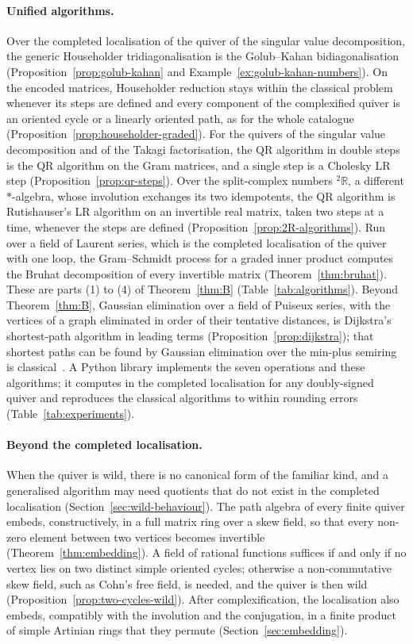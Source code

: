 \documentclass[12pt, a4paper]{report}
\theoremstyle{plain}
\theoremstyle{definition}
\theoremstyle{remark}
\theoremstyle{plain}
\newcommand{\twoR}{{}^{2}\mathbb{R}}
\begin{document}
\paragraph{Unified algorithms.} Over the completed localisation of the quiver of the singular value decomposition, the generic Householder tridiagonalisation is the Golub--Kahan bidiagonalisation (Proposition~\ref{prop:golub-kahan} and Example~\ref{ex:golub-kahan-numbers}). On the encoded matrices, Householder reduction stays within the classical problem whenever its steps are defined and every component of the complexified quiver is an oriented cycle or a linearly oriented path, as for the whole catalogue (Proposition~\ref{prop:householder-graded}). For the quivers of the singular value decomposition and of the Takagi factorisation, the QR algorithm in double steps is the QR algorithm on the Gram matrices, and a single step is a Cholesky LR step (Proposition~\ref{prop:qr-steps}). Over the split-complex numbers $\twoR$, a different $*$-algebra, whose involution exchanges its two idempotents, the QR algorithm is Rutishauser's LR algorithm on an invertible real matrix, taken two steps at a time, whenever the steps are defined (Proposition~\ref{prop:2R-algorithms}). Run over a field of Laurent series, which is the completed localisation of the quiver with one loop, the Gram--Schmidt process for a graded inner product computes the Bruhat decomposition of every invertible matrix (Theorem~\ref{thm:bruhat}). These are parts (1) to (4) of Theorem~\ref{thm:B} (Table~\ref{tab:algorithms}). Beyond Theorem~\ref{thm:B}, Gaussian elimination over a field of Puiseux series, with the vertices of a graph eliminated in order of their tentative distances, is Dijkstra's shortest-path algorithm in leading terms (Proposition~\ref{prop:dijkstra}); that shortest paths can be found by Gaussian elimination over the min-plus semiring is classical~\cite{Carre1971,GondranMinoux2008}. A Python library implements the seven operations and these algorithms; it computes in the completed localisation for any doubly-signed quiver and reproduces the classical algorithms to within rounding errors (Table~\ref{tab:experiments}).

\paragraph{Beyond the completed localisation.} When the quiver is wild, there is no canonical form of the familiar kind, and a generalised algorithm may need quotients that do not exist in the completed localisation (Section~\ref{sec:wild-behaviour}). The path algebra of every finite quiver embeds, constructively, in a full matrix ring over a skew field, so that every non-zero element between two vertices becomes invertible (Theorem~\ref{thm:embedding}). A field of rational functions suffices if and only if no vertex lies on two distinct simple oriented cycles; otherwise a non-commutative skew field, such as Cohn's free field, is needed, and the quiver is then wild (Proposition~\ref{prop:two-cycles-wild}). After complexification, the localisation also embeds, compatibly with the involution and the conjugation, in a finite product of simple Artinian rings that they permute (Section~\ref{sec:embedding}).
\end{document}
